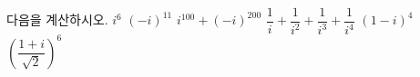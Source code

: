다음을 계산하시오.
 $i^6$
 $(-i)^{11}$
 $i^{100}+(-i)^{200}$
 $\dfrac{1}{i}+\dfrac{1}{i^2}+\dfrac{1}{i^3}+\dfrac{1}{i^4}$
 $(1-i)^4$
 $\left(\dfrac{1+i}{\sqrt{2}}\right)^6$
